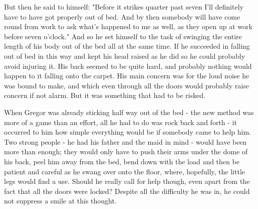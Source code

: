But then he said to himself: "Before it strikes quarter past seven I'll definitely have to have got properly out of bed. And by then somebody will have come round from work to ask what's happened to me as well, as they open up at work before seven o'clock." And so he set himself to the task of swinging the entire length of his body out of the bed all at the same time. If he succeeded in falling out of bed in this way and kept his head raised as he did so he could probably avoid injuring it. His back seemed to be quite hard, and probably nothing would happen to it falling onto the carpet. His main concern was for the loud noise he was bound to make, and which even through all the doors would probably raise concern if not alarm. But it was something that had to be risked.

When Gregor was already sticking half way out of the bed - the new method was more of a game than an effort, all he had to do was rock back and forth - it occurred to him how simple everything would be if somebody came to help him. Two strong people - he had his father and the maid in mind - would have been more than enough; they would only have to push their arms under the dome of his back, peel him away from the bed, bend down with the load and then be patient and careful as he swang over onto the floor, where, hopefully, the little legs would find a use. Should he really call for help though, even apart from the fact that all the doors were locked? Despite all the difficulty he was in, he could not suppress a smile at this thought.

